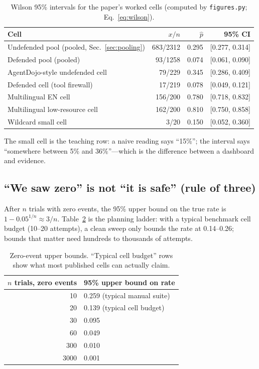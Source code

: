 \begin{table}[htbp]
\centering\small
\caption{Wilson 95\% intervals for the paper's worked cells (computed by
\texttt{figures.py}; Eq.~\ref{eq:wilson}).}\label{tab:wilson}
\begin{tabular}{l r r r}
\toprule
Cell & $x/n$ & $\hat p$ & 95\% CI \\
\midrule
Undefended pool (pooled, Sec.~\ref{sec:pooling}) & 683/2312 & 0.295 & [0.277, 0.314] \\
Defended pool (pooled) & 93/1258 & 0.074 & [0.061, 0.090] \\
AgentDojo-style undefended cell & 79/229 & 0.345 & [0.286, 0.409] \\
Defended cell (tool firewall) & 17/219 & 0.078 & [0.049, 0.121] \\
Multilingual EN cell & 156/200 & 0.780 & [0.718, 0.832] \\
Multilingual low-resource cell & 162/200 & 0.810 & [0.750, 0.858] \\
Wildcard small cell & 3/20 & 0.150 & [0.052, 0.360] \\
\bottomrule
\end{tabular}
\end{table}

The small cell is the teaching row: a naive reading says ``15\%''; the interval
says ``somewhere between 5\% and 36\%''---which is the difference between a
dashboard and evidence.

\subsection{``We saw zero'' is not ``it is safe'' (rule of three)}\label{sec:rule3}

After $n$ trials with zero events, the 95\% upper bound on the true rate is
$1-0.05^{1/n} \approx 3/n$. Table~\ref{tab:rule3} is the planning ladder: with a
typical benchmark cell budget (10--20 attempts), a clean sweep only bounds the
rate at 0.14--0.26; bounds that matter need hundreds to thousands of attempts.

\begin{table}[htbp]
\centering\small
\caption{Zero-event upper bounds. ``Typical cell budget'' rows show what most
published cells can actually claim.}\label{tab:rule3}
\begin{tabular}{r l}
\toprule
$n$ trials, zero events & 95\% upper bound on rate \\
\midrule
10 & 0.259 \quad (typical manual suite) \\
20 & 0.139 \quad (typical cell budget) \\
30 & 0.095 \\
60 & 0.049 \\
300 & 0.010 \\
3000 & 0.001 \\
\bottomrule
\end{tabular}
\end{table}

